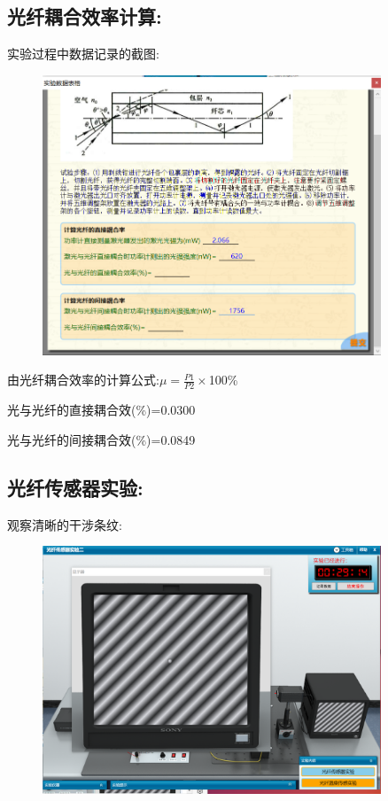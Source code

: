 \documentclass{article}
\begin{document}
\subsection*{光纤耦合效率计算:}
实验过程中数据记录的截图:
\begin{figure}[H]
    \centering
    \includegraphics[width=0.9\textwidth]{虚拟2/1.png}
    \end{figure}

由光纤耦合效率的计算公式:$\mu=\frac{P1}{P2}\times$100\%

光与光纤的直接耦合效(\%)=0.0300

光与光纤的间接耦合效(\%)=0.0849 

\subsection*{光纤传感器实验:}

观察清晰的干涉条纹:
\begin{figure}[H]
    \centering
    \includegraphics[width=0.9\textwidth]{虚拟2/2.png}
    \end{figure}
\end{document}

